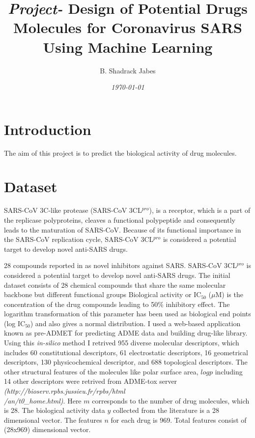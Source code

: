 \documentclass[twocolumn]{article}
\title {{\it Project-} Design of Potential Drugs Molecules for Coronavirus SARS Using Machine Learning}
\author{B. Shadrack Jabes}
\date{\it{\today}}
\begin{document}
\maketitle
\section{Introduction}
The aim of this project is to predict the biological activity of drug molecules.
\section{Dataset}
SARS-CoV 3C-like protease (SARS-CoV 3CL$^{pro}$), is a receptor, which is
  a part of the replicase polyproteins, cleaves a functional polypeptide and
  consequently leads to the maturation of SARS-CoV. Because of its functional
  importance in the SARS-CoV replication cycle, SARS-CoV 3CL$^{pro}$ is considered a
  potential target to develop novel anti-SARS drugs\cite{azwmh03}.


28 compounds reported in\cite{tcll06} as novel
  inhibitors against SARS. SARS-CoV 3CL$^{pro}$ is considered a
  potential target to develop novel anti-SARS drugs\cite{azwmh03}.
The initial dataset consists of 28 chemical compounds that share the same molecular backbone but different functional groups\cite{tcll06}
Biological activity or IC$_{50}$ ($\mu$M) is the concentration of the drug compounds  leading to 50$\%$ inhibitory
      effect. The logarithm transformation of this parameter has been used as
      biological end points (log IC$_{50}$) and also gives a normal distribution.
I used a web-based application known as pre-ADMET for
      predicting ADME data and building drug-like library. Using this {\it
    in-silico}
      method I retrived 955 diverse molecular descriptors, which includes 60
      constitutional descriptors, 61 electrostatic descriptors, 16 geometrical
      descriptors, 130 physicochemical descriptor, and 688 topological
      descriptors. The other structural features of the molecules like polar
      surface area, $log p$ including 14 other descriptors were retrived from ADME-tox server
      {\it (http://bioserv.rpbs.jussieu.fr/rpbs/html\\/an/t0\_home.html)}.
      Here $m$ corresponds to the number of drug molecules, which is 28.
      The biological activity data $y$ collected from the literature is a 28 dimensional vector.
      The features $n$ for each drug is 969. Total features consist of (28x969) dimensional vector.
\end{document}
